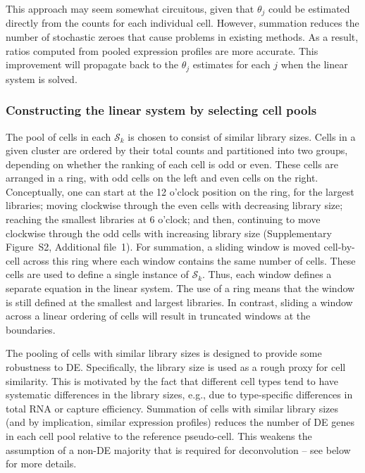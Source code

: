 \documentclass{bmcart}
\newcommand{\suppring}{S2}
\begin{document}
This approach may seem somewhat circuitous, given that $\theta_j$ could be estimated directly from the counts for each individual cell.
However, summation reduces the number of stochastic zeroes that cause problems in existing methods.
As a result, ratios computed from pooled expression profiles are more accurate.
This improvement will propagate back to the $\theta_j$ estimates for each $j$ when the linear system is solved.

\subsubsection*{Constructing the linear system by selecting cell pools}
The pool of cells in each $\mathcal{S}_{k}$ is chosen to consist of similar library sizes.
Cells in a given cluster are ordered by their total counts and partitioned into two groups, depending on whether the ranking of each cell is odd or even.
These cells are arranged in a ring, with odd cells on the left and even cells on the right.
Conceptually, one can start at the 12 o'clock position on the ring, for the largest libraries; moving clockwise through the even cells with decreasing library size;
reaching the smallest libraries at 6 o'clock; and then, continuing to move clockwise through the odd cells with increasing library size (Supplementary Figure~\suppring{}, Additional file~1).
For summation, a sliding window is moved cell-by-cell across this ring where each window contains the same number of cells.
These cells are used to define a single instance of $\mathcal{S}_{k}$.
Thus, each window defines a separate equation in the linear system.
The use of a ring means that the window is still defined at the smallest and largest libraries.
In contrast, sliding a window across a linear ordering of cells will result in truncated windows at the boundaries.

The pooling of cells with similar library sizes is designed to provide some robustness to DE.
Specifically, the library size is used as a rough proxy for cell similarity.
This is motivated by the fact that different cell types tend to have systematic differences in the library sizes, 
    e.g., due to type-specific differences in total RNA or capture efficiency.
Summation of cells with similar library sizes (and by implication, similar expression profiles) reduces the number of DE genes in each cell pool relative to the reference pseudo-cell.
This weakens the assumption of a non-DE majority that is required for deconvolution -- see below for more details.
\end{document}
